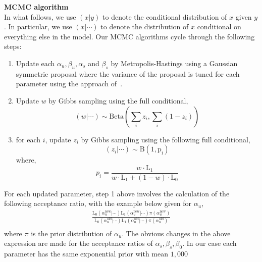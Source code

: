 \documentclass{article}
\begin{document}
\noindent\textbf{MCMC algorithm}\\
In what follows, we use $(x|y)$ to denote the conditional distribution of $x$ given $y$. In particular, we use $(x|\cdots)$ to denote the distribution of $x$ conditional on everything else in the model. Our MCMC algorithms cycle through the following steps: 
\begin{enumerate}
\item Update each $\alpha_u, \beta_u, \alpha_s$ and $\beta_s$ by Metropolis-Hastings using a Gaussian symmetric proposal where the variance of the proposal is tuned for each parameter using the approach of~\cite{Gelman:2004tc,Raftery:1992vp,Raftery:1996ws}.
\item Update $w$ by Gibbs sampling using the full conditional,
\[
(w|\cdots)\sim \mathrm{Beta}(\sum_i z_i,\sum_i (1-z_i))
\]
\item for each $i$, update $z_i$ by Gibbs sampling using the following full conditional,
\[
(z_i|\cdots)\sim\mathrm{B(1,p_i)}
\]
where,
\[
p_i=\frac{w\cdot\mathrm{L_1}}{w\cdot\mathrm{L_1}+(1-w)\cdot\mathrm{L_0}}
\]
\end{enumerate}
For each updated parameter, step 1 above involves the calculation of the following acceptance ratio, with the example below given for $\alpha_u$,
\[
\begin{split}
\frac{\mathrm{L_0}(\alpha^{\text{new}}_u|\cdots)\mathrm{L_1}(\alpha^{\text{new}}_u|\cdots)\pi(\alpha^{\text{new}}_u)}{\mathrm{L_0}(\alpha^{\text{old}}_u|\cdots)\mathrm{L_1}(\alpha^{\text{old}}_u|\cdots)\pi(\alpha^{\text{old}}_u)}\\
\end{split}
\]
where $\pi$ is the prior distribution of $\alpha_u$. The obvious changes in the above expression are made for the acceptance ratios of $\alpha_s,\beta_s,\beta_0$. In our case each parameter has the same exponential prior with mean $1,000$
\end{document}
